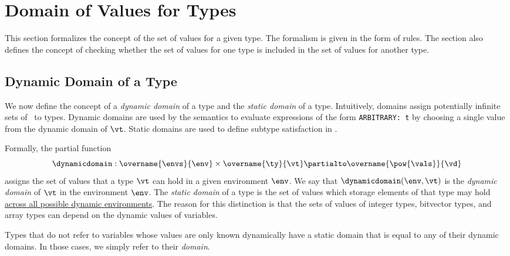 \section{Domain of Values for Types\label{sec:DomainOfValuesForTypes}}
This section formalizes the concept of the set of values for a given type.
The formalism is given in the form of rules.
%
The section also defines the concept of checking whether the set of values
for one type is included in the set of values for another type.

\subsection{Dynamic Domain of a Type\label{sec:DynDomain}}
\hypertarget{def-dyndomain}{}

We now define the concept of a \emph{dynamic domain} of a type
and the \emph{static domain} of a type.
Intuitively, domains assign potentially infinite sets of \nativevalues\ to types.
Dynamic domains are used by the semantics to evaluate expressions of the form \texttt{ARBITRARY: t}
by choosing a single value from the dynamic domain of $\vt$.
Static domains are used to define subtype satisfaction in .

Formally, the partial function
\[
  \dynamicdomain : \overname{\envs}{\env} \times \overname{\ty}{\vt}
  \partialto \overname{\pow{\vals}}{\vd}
\]
assigns the set of values that a type $\vt$ can hold in a given environment $\env$.
%
We say that $\dynamicdomain(\env, \vt)$ is the \emph{dynamic domain} of $\vt$
in the environment $\env$.
%
The \emph{static domain} of a type is the set of values which storage elements of that type may hold
\underline{across all possible dynamic environments}.
%
The reason for this distinction is that the sets of values
of integer types, bitvector types, and array types can depend on the dynamic values of variables.

Types that do not refer to variables whose values are only known dynamically have
a static domain that is equal to any of their dynamic domains.
In those cases, we simply refer to their \emph{domain}.

